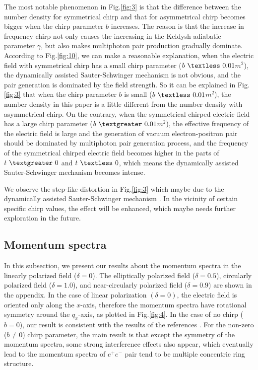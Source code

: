\documentclass[aps,preprint,superscriptaddress]{revtex4}
\begin{document}
The most notable phenomenon in Fig.\ref{fig:3} is that the difference between the number density for symmetrical chirp and that for asymmetrical chirp becomes bigger when the chirp parameter $b$ increases. The reason is that the increase in frequency chirp not only causes the increasing in the Keldysh adiabatic parameter $\gamma$, but also makes multiphoton pair production gradually dominate. According to Fig.\ref{fig:10}, we can make a reasonable explanation, when the electric field with symmetrical chirp has a small chirp parameter ($b~\textless ~0.01$$m^2$), the dynamically assisted Sauter-Schwinger mechanism \cite{Li:2014pp,Schutzhold:2008pz,Abdukerim:2012ke} is not obvious, and the pair generation is dominated by the field strength. So it can be explained in Fig.\ref{fig:3} that when the chirp parameter $b$ is small ($b~ \textless ~0.01$$m^2$), the number density in this paper is a little different from the number density with asymmetrical chirp. On the contrary, when the symmetrical chirped electric field has a large chirp parameter ($b  ~\textgreater ~0.01$$m^2$), the effective frequency of the electric field is large and the generation of vacuum electron-positron pair should be dominated by multiphoton pair generation process, and the frequency of the symmetrical chirped electric field becomes higher in the parts of $t ~\textgreater ~0$ and $t~ \textless ~0$, which means the dynamically assisted Sauter-Schwinger mechanism \cite{Li:2014pp,Schutzhold:2008pz,Abdukerim:2012ke} becomes intense.

We observe the step-like distortion in Fig.\ref{fig:3} which maybe due to the dynamically assisted Sauter-Schwinger mechanism \cite{Li:2014pp,Schutzhold:2008pz,Abdukerim:2012ke}. In the vicinity of certain specific chirp values, the effect will be enhanced, which maybe needs further exploration in the future.




\subsection{Momentum spectra}\label{result2}

In this subsection, we present our results about the momentum spectra in the linearly polarized field ($\delta=0$).
The elliptically polarized field ($\delta=0.5$), circularly polarized field ($\delta=1.0$), and near-circularly polarized field ($\delta=0.9$)
are shown in the appendix. In the case of linear polarization $(\delta=0)$, the electric field is oriented only along the $x$-axis, therefore the momentum spectra have rotational symmetry around the $q_x$-axis, as plotted in Fig.\ref{fig:4}. In the case of no chirp ($b=0$), our result is consistent with the results of the references \cite{Olugh:2019pd,Li:2017pd}. For the non-zero ($b\neq0$) chirp parameter, the main result is that except the symmetry of the momentum spectra, some strong interference effects also appear, which eventually lead to the momentum spectra of $e^{+}e^{-}$ pair tend to be multiple concentric ring structure.
\end{document}
